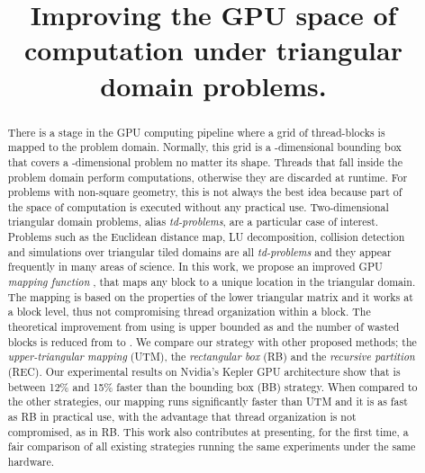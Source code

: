 \documentclass[conference]{IEEEtran}
\begin{document}
\title{Improving the GPU space of computation under triangular domain problems.}

\author{
\and
{}
}


\maketitle
\begin{abstract}
There is a stage in the GPU computing pipeline where a grid of thread-blocks is mapped to the problem domain. 
Normally, this grid is a -dimensional bounding box that covers a -dimensional problem no matter its shape. Threads that 
fall inside the problem domain perform computations, otherwise they are discarded at runtime.
For problems with non-square geometry, this is not always the best idea because part of the space of computation is executed without any practical use.
Two-dimensional triangular domain problems, alias \textit{td-problems}, are a particular case of interest. 
Problems such as the Euclidean distance map, LU decomposition, collision detection and simulations over triangular tiled domains are all \textit{td-problems} and they appear frequently in many 
areas of science. 
In this work, we propose an improved GPU \textit{mapping function} , that maps any  block to a unique location  in the triangular domain.
The mapping is based on the properties of the lower triangular matrix and it works at a block level, thus not compromising thread organization within a block. 
The theoretical improvement from using  is upper bounded as  and the number of wasted blocks is reduced from  to . 
We compare our strategy with other proposed methods; the \textit{upper-triangular mapping} (UTM), the \textit{rectangular box} (RB) and the \textit{recursive partition} (REC). 
Our experimental results on Nvidia's Kepler GPU architecture show that  is between 12\% and 15\% faster than the bounding box (BB) strategy. When compared to the other strategies, 
our mapping runs significantly faster than UTM and it is as fast as RB in practical use, with the advantage that thread organization is not compromised, as in RB. This work also contributes at presenting, 
for the first time, a fair comparison of all existing strategies running the same experiments under the same hardware.
\end{abstract}
\end{document}
